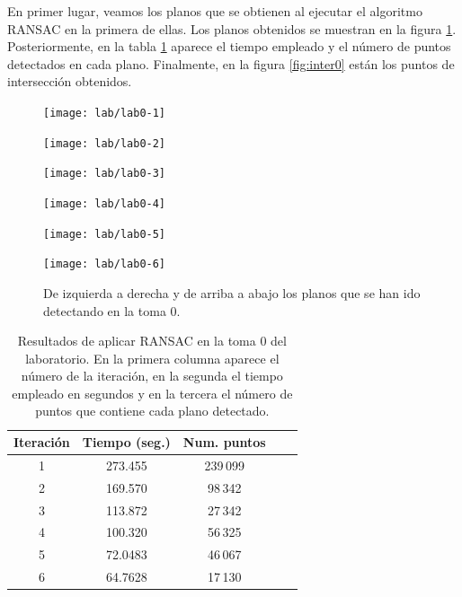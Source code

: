 En primer lugar, veamos los planos que se obtienen al ejecutar el algoritmo RANSAC en la primera de ellas. Los planos obtenidos se muestran en la figura \ref{fig:planos-lab0}. Posteriormente, en la tabla \ref{table:res-lab0} aparece el tiempo empleado y el número de puntos detectados en cada plano. Finalmente, en la figura \ref{fig:inter0} están los puntos de intersección obtenidos. \\

\begin{figure}[h!]
	\centering
	\begin{minipage}{0.4\textwidth}
		\centering
		\texttt{[image: lab/lab0-1]} 
	\end{minipage}
	\centering
	\begin{minipage}{0.4\textwidth}
		\centering
		\texttt{[image: lab/lab0-2]} 
	\end{minipage}
	\begin{minipage}{0.4\textwidth}
		\centering
		\texttt{[image: lab/lab0-3]} 
	\end{minipage}
	\centering
	\begin{minipage}{0.4\textwidth}
		\centering
		\texttt{[image: lab/lab0-4]} 
	\end{minipage}
	\begin{minipage}{0.4\textwidth}
		\centering
		\texttt{[image: lab/lab0-5]} 
	\end{minipage}
	\centering
	\begin{minipage}{0.4\textwidth}
		\centering
		\texttt{[image: lab/lab0-6]} 
	\end{minipage}
	\caption{De izquierda a derecha y de arriba a abajo los planos que se han ido detectando en la toma 0.}
	\label{fig:planos-lab0}
\end{figure}

\begin{table}[h!]
	\centering
	\begin{tabular}{| c | c | c | c | c |} 
		\hline
		Iteración  & Tiempo (seg.) & Num. puntos \\
		\hline
		1 & 273.455 & 239\,099 \\				  
		2 & 169.570 & 98\,342  \\	
		3 & 113.872 &  27\,342 \\
		4 & 100.320 &   56\,325\\
		5 & 72.0483 & 46\,067 \\
		6 & 64.7628 & 17\,130 \\
		\hline
	\end{tabular}
	\caption{Resultados de aplicar RANSAC en la toma 0 del laboratorio. En la primera columna aparece el número de la iteración, en la segunda el tiempo empleado en segundos y en la tercera el número de puntos que contiene cada plano detectado.}
	\label{table:res-lab0}
\end{table}

